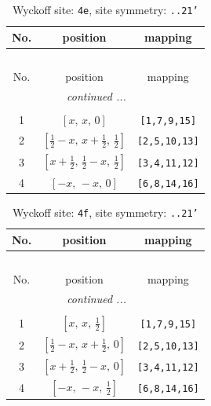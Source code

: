 \documentclass[fleqn,8pt]{jsarticle}
\begin{document}
\renewcommand{\arraystretch}{1.2}
\begin{longtable}{ccc}
\caption{Wyckoff site: {\tt 4e}, site symmetry: {\tt ..21'}}
 \\
 \hline \hline
No. & position & mapping \\ \hline \endfirsthead

\multicolumn{2}{l}{\tablename\ \thetable{}} \\
 \hline \hline
No. & position & mapping \\ \hline \endhead

 \hline \hline
\multicolumn{2}{r}{\footnotesize\it continued ...} \\ \endfoot

 \hline \hline
\multicolumn{2}{r}{} \\ \endlastfoot

1 & $\left[ x,\, x,\, 0 \right]$ & {\tt [1,7,9,15]} \\ \hline
2 & $\left[ \frac{1}{2} - x,\, x + \frac{1}{2},\, \frac{1}{2} \right]$ & {\tt [2,5,10,13]} \\ \hline
3 & $\left[ x + \frac{1}{2},\, \frac{1}{2} - x,\, \frac{1}{2} \right]$ & {\tt [3,4,11,12]} \\ \hline
4 & $\left[ - x,\, - x,\, 0 \right]$ & {\tt [6,8,14,16]} \\
\end{longtable}
\renewcommand{\arraystretch}{1.2}
\begin{longtable}{ccc}
\caption{Wyckoff site: {\tt 4f}, site symmetry: {\tt ..21'}}
 \\
 \hline \hline
No. & position & mapping \\ \hline \endfirsthead

\multicolumn{2}{l}{\tablename\ \thetable{}} \\
 \hline \hline
No. & position & mapping \\ \hline \endhead

 \hline \hline
\multicolumn{2}{r}{\footnotesize\it continued ...} \\ \endfoot

 \hline \hline
\multicolumn{2}{r}{} \\ \endlastfoot

1 & $\left[ x,\, x,\, \frac{1}{2} \right]$ & {\tt [1,7,9,15]} \\ \hline
2 & $\left[ \frac{1}{2} - x,\, x + \frac{1}{2},\, 0 \right]$ & {\tt [2,5,10,13]} \\ \hline
3 & $\left[ x + \frac{1}{2},\, \frac{1}{2} - x,\, 0 \right]$ & {\tt [3,4,11,12]} \\ \hline
4 & $\left[ - x,\, - x,\, \frac{1}{2} \right]$ & {\tt [6,8,14,16]} \\
\end{longtable}
\end{document}
